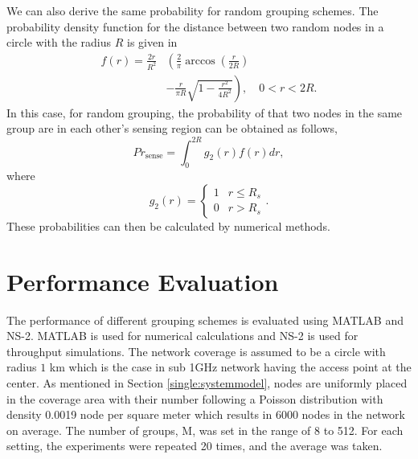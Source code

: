 We can also derive the same probability for random grouping schemes. The probability density function for the distance between two random nodes in a circle with the radius $R$ is given in \cite{moltchanov2012distance}
\begin{equation}
\begin{split}
f(r)=\frac{2r}{R^2} & \left( \frac{2}{\pi}\arccos(\frac{r}{2R}) \right. \\
& \left.  - \frac{r}{\pi R} \sqrt{1- \frac{r^2}{4R^2}} \right ) ,\quad 0<r<2R.
\end{split}
\end{equation}
In this case, for random grouping, the probability of that two nodes in the same group are in each other's sensing region can be obtained as follows,
\begin{equation}
Pr_{\text{sense}}=\int_0^{2R}g_2(r)f(r)dr,
\end{equation}
where
\begin{equation}
g_2(r)=
\begin{cases} 
      1 & r \leq R_s \\
      0 & r > R_s
   \end{cases}.
\end{equation}
These probabilities can then be calculated by numerical methods.




\section{Performance Evaluation}
\label{single:evaluation}

The performance of different grouping schemes is evaluated using MATLAB and NS-2\cite{breslau2000advances}. MATLAB is used for numerical calculations and NS-2 is used for throughput simulations. The network coverage is assumed to be a circle with radius $1$ km which is the case in sub 1GHz network having the access point at the center. As mentioned in Section \ref{single:systemmodel}, nodes are uniformly placed in the coverage area with their number following a Poisson distribution with density 0.0019 node per square meter which results in 6000 nodes in the network on average. The number of groups, M, was set in the range of 8 to 512. For each setting, the experiments were repeated 20 times, and the average was taken. 


